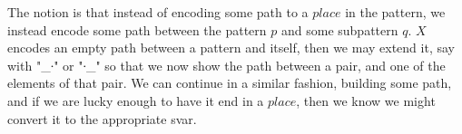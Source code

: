 The notion is that instead of encoding some path to a $place$ in the pattern,
we instead encode some path between the pattern $p$ and some subpattern $q$. 
$X$ encodes an empty path between a pattern and itself, then we
may extend it, say with "\_∙" or "∙\_" so that we now show the path between
a pair, and one of the elements of that pair. We can continue in a similar fashion,
building some path, and if we are lucky enough to have it end in a $place$, then
we know we might convert it to the appropriate svar.
